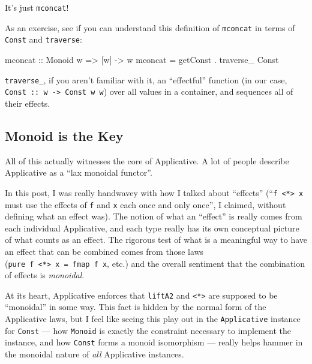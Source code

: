\documentclass[]{article}
\newenvironment{Shaded}{}{}
\newcommand{\DataTypeTok}[1]{\textcolor[rgb]{0.56,0.13,0.00}{#1}}
\newcommand{\FunctionTok}[1]{\textcolor[rgb]{0.02,0.16,0.49}{#1}}
\newcommand{\NormalTok}[1]{#1}
\newcommand{\OperatorTok}[1]{\textcolor[rgb]{0.40,0.40,0.40}{#1}}
\newcommand{\OtherTok}[1]{\textcolor[rgb]{0.00,0.44,0.13}{#1}}
\begin{document}
It's just \texttt{mconcat}!

As an exercise, see if you can understand this definition of \texttt{mconcat} in
terms of \texttt{Const} and \texttt{traverse}:

\begin{Shaded}
\begin{Highlighting}[]
\FunctionTok{mconcat}\OtherTok{ ::} \DataTypeTok{Monoid}\NormalTok{ w }\OtherTok{=>}\NormalTok{ [w] }\OtherTok{{-}>}\NormalTok{ w}
\FunctionTok{mconcat} \OtherTok{=}\NormalTok{ getConst }\OperatorTok{.}\NormalTok{ traverse\_ }\DataTypeTok{Const}
\end{Highlighting}
\end{Shaded}

\texttt{traverse\_}, if you aren't familiar with it, an ``effectful'' function
(in our case, \texttt{Const\ ::\ w\ -\textgreater{}\ Const\ w\ w}) over all
values in a container, and sequences all of their effects.

\hypertarget{monoid-is-the-key}{%
\subsection{Monoid is the Key}\label{monoid-is-the-key}}

All of this actually witnesses the core of Applicative. A lot of people describe
Applicative as a ``lax monoidal functor''.

In this post, I was really handwavey with how I talked about ``effects''
(``\texttt{f\ \textless{}*\textgreater{}\ x} must use the effects of \texttt{f}
and \texttt{x} each once and only once'', I claimed, without defining what an
effect was). The notion of what an ``effect'' is really comes from each
individual Applicative, and each type really has its own conceptual picture of
what counts as an effect. The rigorous test of what is a meaningful way to have
an effect that can be combined comes from those laws
(\texttt{pure\ f\ \textless{}*\textgreater{}\ x\ =\ fmap\ f\ x}, etc.) and the
overall sentiment that the combination of effects is \emph{monoidal}.

At its heart, Applicative enforces that \texttt{liftA2} and
\texttt{\textless{}*\textgreater{}} are supposed to be ``monoidal'' in some way.
This fact is hidden by the normal form of the Applicative laws, but I feel like
seeing this play out in the \texttt{Applicative} instance for \texttt{Const} ---
how \texttt{Monoid} is exactly the constraint necessary to implement the
instance, and how \texttt{Const} forms a monoid isomorphism --- really helps
hammer in the monoidal nature of \emph{all} Applicative instances.
\end{document}
